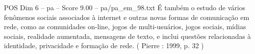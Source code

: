 \begin{textsample}{POS Dim 6 – pa – Score 9.00 – pa/pa\_em\_98.txt}
É também o estudo de vários fenômenos sociais associados à internet e outras novas formas de comunicação em rede, como as comunidades on-line, jogos de multi-usuários, jogos sociais, mídias sociais, realidade aumentada, mensagens de texto, e inclui questões relacionadas à identidade, privacidade e formação de rede. ( Pierre : 1999, p. 32 )

\end{textsample}
